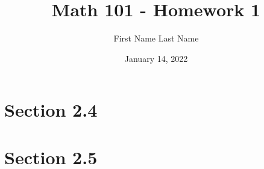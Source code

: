 
\title{Math 101 - Homework 1}
\date{January 14, 2022}
\author{First Name Last Name}


\maketitle

\section*{Section 2.4}
\section*{Section 2.5}


